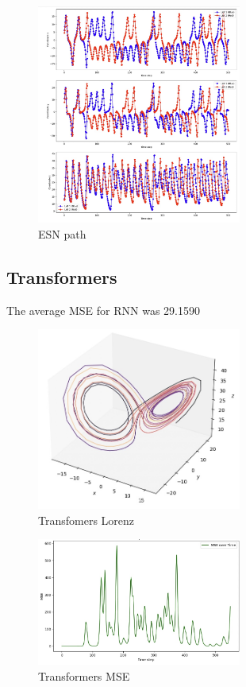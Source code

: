 \documentclass[11pt]{article}
\begin{document}
\begin{figure}[h]
\centering
\includegraphics[width=0.6\textwidth]{echo_path.jpeg}
\caption{ESN path}
\end{figure}

\subsection{Transformers}
The average MSE for RNN was 29.1590

\begin{figure}[h]
\centering
\includegraphics[width=0.6\textwidth]{transformers_lorenz.jpeg}
\caption{Transfomers Lorenz}
\end{figure}

\begin{figure}[h]
\centering
\includegraphics[width=0.6\textwidth]{transformers_mse.jpeg}
\caption{Transformers MSE}
\end{figure}
\end{document}
